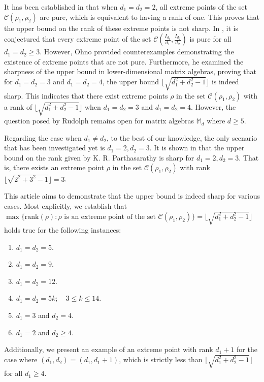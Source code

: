 \documentclass[10pt,reqno]{amsart}
\theoremstyle{definition}
\theoremstyle{plain}
\theoremstyle{remark}
\newcommand{\mbb}[1]{\mathbb{#1}}
\newcommand{\msc}[1]{\mathscr{#1}}
\newcommand{\M}[1]{\mbb{M}_{#1}}%
\numberwithin{equation}{section}%
\begin{document}
It has been established in \cite{krp05} that when $d_1=d_2=2$, all extreme points of the set $\msc{C}(\rho_1, \rho_2)$ are pure, which is equivalent to having a rank of one. This proves that the upper bound on the rank of these extreme points is not sharp. In \cite{PrSa07}, it is conjectured that every extreme point of the set $\msc{C}(\frac{I_{d_1}}{d_1}, \frac{I_{d_2}}{d_2})$ is pure for all $d_1 = d_2 \geq 3$. However, Ohno \cite{Ohno10} provided counterexamples demonstrating the existence of extreme points that are not pure. Furthermore, he examined the sharpness of the upper bound in lower-dimensional matrix algebras, proving that for $d_1 = d_2 = 3$ and $d_1 = d_2 = 4$, the upper bound $\lfloor{\sqrt{d_1^2 + d_2^2 - 1}}\rfloor$ is indeed sharp. This indicates that there exist extreme points $\rho$ in the set $\msc{C}(\rho_1, \rho_2)$ with a rank of $\lfloor \sqrt{d_1^2 + d_2^2 - 1} \rfloor$ when $d_1 = d_2 = 3$ and $d_1 = d_2 = 4$. However, the question posed by Rudolph remains open for matrix algebras $\M{d}$ where $d\geq 5$. 



Regarding the case when $d_1\neq d_2$, to the best of our knowledge, the only scenario that has been investigated yet is $d_1 = 2, d_2 = 3$. It is shown in \cite{KS21} that the upper bound on the rank given by K. R. Parthasarathy is sharp for $d_1 = 2, d_2 = 3$. That is, there exists an extreme point $\rho$ in the set $\msc{C}(\rho_1, \rho_2)$ with rank $\lfloor \sqrt{2^2 + 3^2 - 1} \rfloor=3$.



This article aims to demonstrate that the upper bound is indeed sharp for various cases. Most explicitly, we establish that $\max\{\text{rank}(\rho): \rho \text{ is an extreme point of the set } \msc{C}(\rho_1,\rho_2)\}=\lfloor{\sqrt{d_1^2+d_2^2-1}}\rfloor$ holds true for the following instances:
\begin{enumerate}[label=(\roman*)]
\item $d_1=d_2=5$.
\item $d_1=d_2=9$.
\item $d_1=d_2=12$.
\item $d_1=d_2=5k;\quad 3\leq k\leq 14$.
\item $d_1=3$ and $d_2=4$.
\item $d_1=2$ and $d_2\geq 4$.
\end{enumerate}
Additionally, we present an example of an extreme point with rank $d_1+1$ for the case where $(d_1,d_2)=(d_1,d_1+1)$, which is strictly less than $\lfloor{\sqrt{d_1^2+d_2^2-1}}\rfloor$ for all $d_1\geq 4$. 
\end{document}
